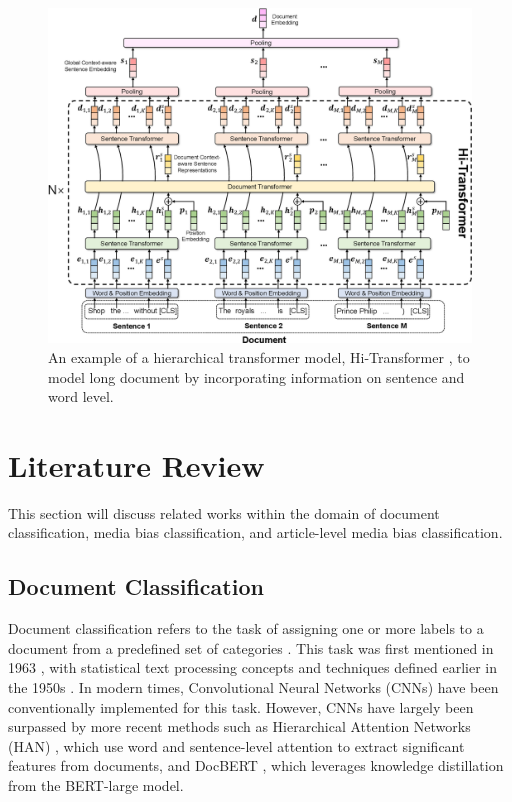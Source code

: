 \begin{figure}[htbp]
    \centering
    \includegraphics[width=0.9\linewidth]{images/hi_transformer.png}
    \caption{An example of a hierarchical transformer model, Hi-Transformer \cite{wu-2021-hi-transformer}, to model long document by incorporating information on sentence and word level.}
    \label{fig:hi_transformer}
\end{figure}


\section{Literature Review}

This section will discuss related works within the domain of document classification, media bias classification, and article-level media bias classification.


\subsection{Document Classification}

Document classification refers to the task of assigning one or more labels to a document from a predefined set of categories \cite{wan-2019-long-length}. This task was first mentioned in 1963 \cite{borko-1963-auto-doc-classification}, with statistical text processing concepts and techniques defined earlier in the 1950s \cite{luhn-1958-business-intelligence-system}. In modern times, Convolutional Neural Networks (CNNs) \cite{afzal-deepdocclassifier,liu-2017-xmlcnn} have been conventionally implemented for this task. However, CNNs have largely been surpassed by more recent methods such as Hierarchical Attention Networks (HAN) \cite{yang-2016-han}, which use word and sentence-level attention to extract significant features from documents, and DocBERT \cite{adhikari-2019-docbert}, which leverages knowledge distillation from the BERT-large model.


